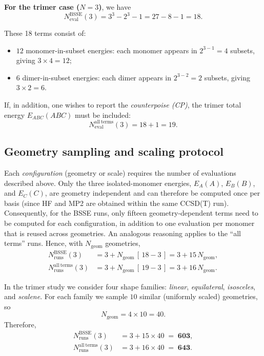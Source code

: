 \noindent\textbf{For the trimer case ($N=3$)}, we have
\begin{equation*}
N_{\mathrm{eval}}^{\mathrm{BSSE}}(3)
= 3^{3} - 2^{3} - 1
= 27 - 8 - 1
= \boxed{18}.
\end{equation*}

These 18 terms consist of:
\begin{itemize}[leftmargin=2em,topsep=-0.25cm]
  \item $12$ monomer-in-subset energies: each monomer appears in $2^{3-1}=4$ subsets,
        giving $3\times 4 = 12$;
  \item $6$ dimer-in-subset energies: each dimer appears in $2^{3-2}=2$ subsets,
        giving $3\times 2 = 6$.
\end{itemize}
If, in addition, one wishes to report the \emph{counterpoise (CP)},
the trimer total energy $E_{ABC}(ABC)$ must be included:
\begin{equation*}
N_{\mathrm{eval}}^{\mathrm{all\ terms}}(3)
= 18 + 1 = \boxed{19}.
\end{equation*}

\clearpage
\subsection{Geometry sampling and scaling protocol}
\label{sec:families}

Each \emph{configuration} (geometry or scale) requires the number of evaluations described above.  
Only the three isolated-monomer energies, $E_A(A)$, $E_B(B)$, and $E_C(C)$, are geometry independent and can therefore be computed once per basis (since HF and MP2 are obtained within the same CCSD(T) run).  
Consequently, for the BSSE runs, only fifteen geometry-dependent terms need to be computed for each configuration, in addition to one evaluation per monomer that is reused across geometries.  
An analogous reasoning applies to the ``all terms'' runs.  
Hence, with $N_{\mathrm{geom}}$ geometries,
\[
\boxed{
\begin{aligned}
N_{\mathrm{runs}}^{\mathrm{BSSE}}(3)
  &= 3 + N_{\mathrm{geom}}\,[\,18 - 3\,]
   = 3 + 15\,N_{\mathrm{geom}},\\[4pt]
N_{\mathrm{runs}}^{\mathrm{all\ terms}}(3)
  &= 3 + N_{\mathrm{geom}}\,[\,19 - 3\,]
   = 3 + 16\,N_{\mathrm{geom}}.
\end{aligned}}
\]

In the trimer study we consider four shape families:
\emph{linear}, \emph{equilateral}, \emph{isosceles}, and \emph{scalene}.
For each family we sample $10$ similar (uniformly scaled) geometries, so
\begin{equation*}
N_{\mathrm{geom}} = 4 \times 10 = 40.
\end{equation*}
Therefore,
\begin{equation*}
\boxed{
\begin{aligned}
N_{\mathrm{runs}}^{\mathrm{BSSE}}(3) 
  &= 3 + 15\times 40 \;=\; \mathbf{603},\\[2pt]
N_{\mathrm{runs}}^{\mathrm{all\ terms}}(3) 
  &= 3 + 16\times 40 \;=\; \mathbf{643}.
\end{aligned}}
\end{equation*}

